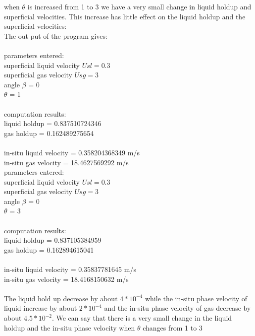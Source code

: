 \documentclass[10pt,a4paper]{report}
\begin{document}
when $\theta$ is increased from 1 to 3 we have a very small change in liquid holdup and superficial velocities. This increase has little effect on the liquid holdup and the superficial velocities:\\
The out put of the program gives:
\\
\\
parameters entered:\\
superficial liquid velocity $Usl =  0.3$\\
superficial gas velocity $Usg    =  3$\\
angle $\beta$                      =  0\\
$\theta$                           =  1\\
\\
computation results:\\
liquid holdup             = 0.837510724346\\
gas holdup                = 0.162489275654\\
\\
in-situ liquid velocity   = 0.358204368349 m/s\\
in-situ gas velocity      = 18.4627569292 m/s\\




\clearpage
parameters entered:\\
superficial liquid velocity $Usl =  0.3$\\
superficial gas velocity $Usg    =  3$  \\
angle $\beta$                    =  0  \\
$\theta$                         =  3\\
\\
computation results:\\
liquid holdup             = 0.837105384959\\
gas holdup                = 0.162894615041\\
\\
in-situ liquid velocity   = 0.35837781645 m/s\\
in-situ gas velocity      = 18.4168150632 m/s\\
\\
The liquid hold up decrease by about $4*10^{-4}$ while the in-situ phase velocity of liquid increase by about $2*10^{-4}$ and the in-situ phase velocity of gas decrease by about $4.5*10^{-2}$. We can say that there is a very small change in the liquid holdup and the in-situ phase velocity when $\theta$ changes from 1 to 3
\end{document}
